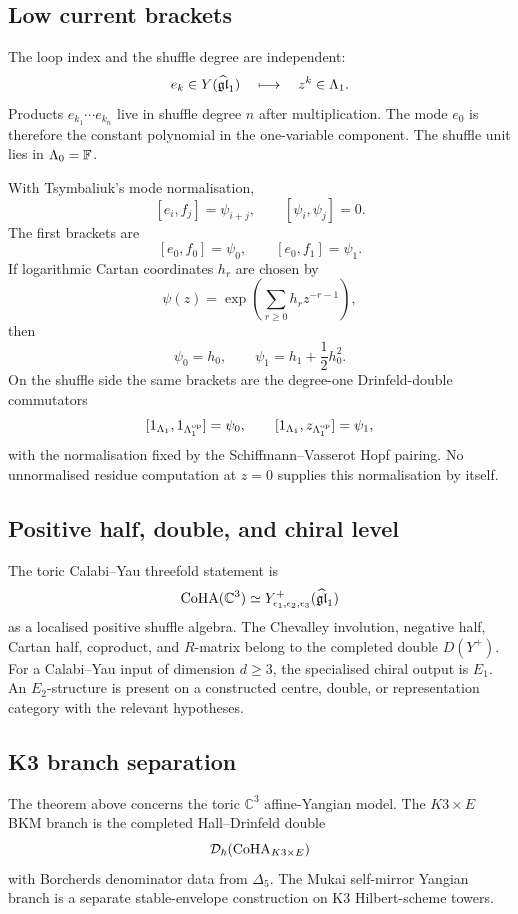 \subsection{Low current brackets}

The loop index and the shuffle degree are independent:
\[
  e_k\in Y(\widehat{\mathfrak{gl}}_1)\quad\longmapsto\quad z^k\in\Lambda_1 .
\]
Products \(e_{k_1}\cdots e_{k_n}\) live in shuffle degree \(n\) after
multiplication.  The mode \(e_0\) is therefore the constant polynomial
in the one-variable component.  The shuffle unit lies in
\(\Lambda_0=\mathbb F\).

With Tsymbaliuk's mode normalisation,
\[
  [e_i,f_j]=\psi_{i+j},\qquad [\psi_i,\psi_j]=0 .
\]
The first brackets are
\[
  [e_0,f_0]=\psi_0,\qquad [e_0,f_1]=\psi_1 .
\]
If logarithmic Cartan coordinates \(h_r\) are chosen by
\[
  \psi(z)=\exp\!\left(\sum_{r\geq0}h_r z^{-r-1}\right),
\]
then
\[
  \psi_0=h_0,\qquad
  \psi_1=h_1+\frac{1}{2}h_0^2 .
\]
On the shuffle side the same brackets are the degree-one
Drinfeld-double commutators
\[
  [1_{\Lambda_1},1_{\Lambda_1^{\mathrm{op}}}]=\psi_0,\qquad
  [1_{\Lambda_1},z_{\Lambda_1^{\mathrm{op}}}]=\psi_1 ,
\]
with the normalisation fixed by the Schiffmann--Vasserot Hopf pairing.
No unnormalised residue computation at \(z=0\) supplies this
normalisation by itself.

\subsection{Positive half, double, and chiral level}

The toric Calabi--Yau threefold statement is
\[
  \mathrm{CoHA}(\mathbb C^3)\simeq
  Y^+_{\epsilon_1,\epsilon_2,\epsilon_3}(\widehat{\mathfrak{gl}}_1)
\]
as a localised positive shuffle algebra.  The Chevalley involution,
negative half, Cartan half, coproduct, and \(R\)-matrix belong to the
completed double \(D(Y^+)\).  For a Calabi--Yau input of dimension
\(d\geq3\), the specialised chiral output is \(E_1\).  An
\(E_2\)-structure is present on a
constructed centre, double, or representation category with the
relevant hypotheses.

\subsection{K3 branch separation}

The theorem above concerns the toric \(\mathbb C^3\) affine-Yangian
model.  The \(K3\times E\) BKM branch is the completed Hall--Drinfeld
double
\[
  \mathcal D_\hbar(\mathrm{CoHA}_{K3\times E})
\]
with Borcherds denominator data from \(\Delta_5\).  The Mukai
self-mirror Yangian branch is a separate stable-envelope construction
on K3 Hilbert-scheme towers.

